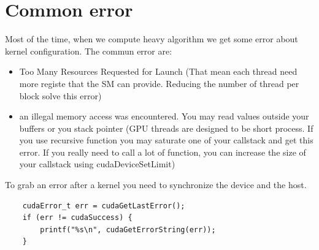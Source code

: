 \documentclass{article}
\begin{document}
\section{Common error}
Most of the time, when we compute heavy algorithm we get some error about kernel configuration. The commun error are:
\begin{itemize}
	\item Too Many Resources Requested for Launch (That mean each thread need more registe that the SM can provide. Reducing the number of thread per block solve this error)
	\item an illegal memory access was encountered. You may read values outside your buffers or you stack pointer (GPU threads are designed to be short process. If you use recursive function you may saturate one of your callstack and get this error. If you really need to call a lot of function, you can increase the size of your callstack using cudaDeviceSetLimit)
\end{itemize}
To grab an error after a kernel you need to synchronize the device and the host.
\begin{lstlisting}
	cudaError_t err = cudaGetLastError();
	if (err != cudaSuccess) {
		printf("%s\n", cudaGetErrorString(err));
	}
\end{lstlisting}
\end{document}
